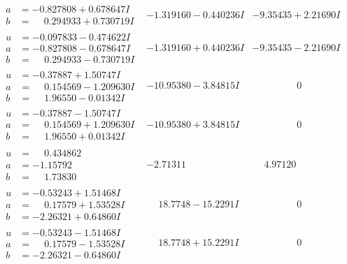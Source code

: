 \documentclass[1p]{elsarticle_modified}
\theoremstyle{definition}
\begin{document}
$$\begin{array}{c|c|c}
\begin{aligned}
a &= -0.827808 + 0.678647 I \\
b &= \phantom{-}0.294933 + 0.730719 I\end{aligned}
 & -1.319160 - 0.440236 I & -9.35435 + 2.21690 I \\ \hline\begin{aligned}
u &= -0.097833 - 0.474622 I \\
a &= -0.827808 - 0.678647 I \\
b &= \phantom{-}0.294933 - 0.730719 I\end{aligned}
 & -1.319160 + 0.440236 I & -9.35435 - 2.21690 I \\ \hline\begin{aligned}
u &= -0.37887 + 1.50747 I \\
a &= \phantom{-}0.154569 - 1.209630 I \\
b &= \phantom{-}1.96550 - 0.01342 I\end{aligned}
 & -10.95380 - 3.84815 I & \phantom{-0.000000 } 0 \\ \hline\begin{aligned}
u &= -0.37887 - 1.50747 I \\
a &= \phantom{-}0.154569 + 1.209630 I \\
b &= \phantom{-}1.96550 + 0.01342 I\end{aligned}
 & -10.95380 + 3.84815 I & \phantom{-0.000000 } 0 \\ \hline\begin{aligned}
u &= \phantom{-}0.434862\phantom{ +0.000000I} \\
a &= -1.15792\phantom{ +0.000000I} \\
b &= \phantom{-}1.73830\phantom{ +0.000000I}\end{aligned}
 & -2.71311\phantom{ +0.000000I} & \phantom{-}4.97120\phantom{ +0.000000I} \\ \hline\begin{aligned}
u &= -0.53243 + 1.51468 I \\
a &= \phantom{-}0.17579 + 1.53528 I \\
b &= -2.26321 + 0.64860 I\end{aligned}
 & \phantom{-}18.7748 - 15.2291 I & \phantom{-0.000000 } 0 \\ \hline\begin{aligned}
u &= -0.53243 - 1.51468 I \\
a &= \phantom{-}0.17579 - 1.53528 I \\
b &= -2.26321 - 0.64860 I\end{aligned}
 & \phantom{-}18.7748 + 15.2291 I & \phantom{-0.000000 } 0 \\ \hline\begin{aligned}

\end{aligned}
\end{array}$$
\end{document}
